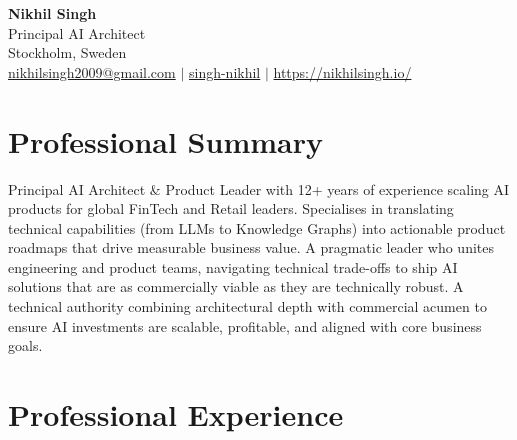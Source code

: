 \documentclass[11pt,a4paper]{article}
\begin{document}
  \begin{center}
      {\LARGE \textbf{Nikhil Singh}} \\[0.3em]
      {\large Principal AI Architect} \\[0.5em]
      Stockholm, Sweden \\[0.3em]
      \href{mailto:nikhilsingh2009@gmail.com}{nikhilsingh2009@gmail.com} $|$
      \href{https://linkedin.com/in/singh-nikhil}{singh-nikhil} $|$
      \href{https://nikhilsingh.io/}{https://nikhilsingh.io/}
  \end{center}

\section*{Professional Summary}
\small
Principal AI Architect \& Product Leader with 12+ years of experience scaling AI products for global FinTech and Retail leaders. Specialises in translating technical capabilities (from LLMs to Knowledge Graphs) into actionable product roadmaps that drive measurable business value. A pragmatic leader who unites engineering and product teams, navigating technical trade-offs to ship AI solutions that are as commercially viable as they are technically robust. A technical authority combining architectural depth with commercial acumen to ensure AI investments are scalable, profitable, and aligned with core business goals.

\section*{Professional Experience}
\end{document}
